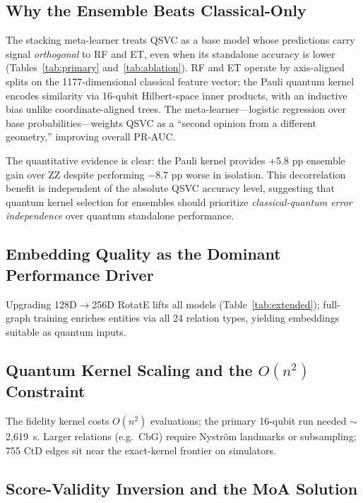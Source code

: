 \documentclass[10pt,twocolumn]{article}
\begin{document}
\subsection{Why the Ensemble Beats Classical-Only}

The stacking meta-learner treats QSVC as a base model whose predictions carry signal \textit{orthogonal} to RF and ET, even when its standalone accuracy is lower (Tables~\ref{tab:primary} and~\ref{tab:ablation}). RF and ET operate by axis-aligned splits on the 1177-dimensional classical feature vector; the Pauli quantum kernel encodes similarity via 16-qubit Hilbert-space inner products, with an inductive bias unlike coordinate-aligned trees. The meta-learner---logistic regression over base probabilities---weights QSVC as a ``second opinion from a different geometry,'' improving overall PR-AUC.

The quantitative evidence is clear: the Pauli kernel provides +5.8 pp ensemble gain over ZZ despite performing $-8.7$ pp worse in isolation. This decorrelation benefit is independent of the absolute QSVC accuracy level, suggesting that quantum kernel selection for ensembles should prioritize \textit{classical-quantum error independence} over quantum standalone performance.

\subsection{Embedding Quality as the Dominant Performance Driver}

Upgrading 128D$\to$256D RotatE lifts all models (Table~\ref{tab:extended}); full-graph training enriches entities via all 24 relation types, yielding embeddings suitable as quantum inputs.

\subsection{Quantum Kernel Scaling and the \texorpdfstring{$O(n^2)$}{O(n-squared)} Constraint}

The fidelity kernel costs $O(n^2)$ evaluations; the primary 16-qubit run needed ${\sim}$2,619~s. Larger relations (e.g.\ CbG) require Nystr\"{o}m landmarks or subsampling; 755 CtD edges sit near the exact-kernel frontier on simulators.

\subsection{Score-Validity Inversion and the MoA Solution}
\end{document}
